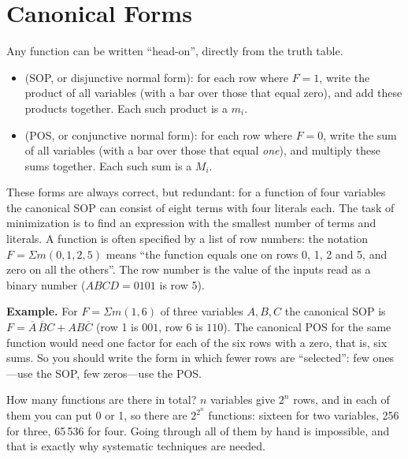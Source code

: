 \section{Canonical Forms}

Any function can be written ``head-on'', directly from the truth table.

\begin{itemize}
  \item {} (SOP, or disjunctive normal form):
        for each row where $F=1$, write the product of all variables (with
        a bar over those that equal zero), and add these products together.
        Each such product is a  $m_i$.
  \item {} (POS, or conjunctive normal form):
        for each row where $F=0$, write the sum of all variables (with a bar
        over those that equal \emph{one}), and multiply these sums together.
        Each such sum is a  $M_i$.
\end{itemize}

These forms are always correct, but redundant: for a function of four
variables the canonical SOP can consist of eight terms with four literals
each. The task of minimization is to find an expression with the smallest
number of terms and literals. A function is often specified by a list of row
numbers: the notation $F=\Sigma m(0,1,2,5)$ means ``the function equals one on
rows 0, 1, 2 and 5, and zero on all the others''. The row number is the value
of the inputs read as a binary number ($ABCD=0101$ is row 5).

\textbf{Example.} For $F=\Sigma m(1,6)$ of three variables $A,B,C$ the
canonical SOP is $F=\overline{A}\,\overline{B}C + AB\overline{C}$ (row 1 is
$001$, row 6 is $110$). The canonical POS for the same function would need
one factor for each of the six rows with a zero, that is, six sums. So you
should write the form in which fewer rows are ``selected'': few ones---use
the SOP, few zeros---use the POS.

How many functions are there in total? $n$ variables give $2^n$ rows, and in
each of them you can put 0 or 1, so there are $2^{2^n}$ functions: sixteen for
two variables, 256 for three, 65\,536 for four. Going through all of them by
hand is impossible, and that is exactly why systematic techniques are needed.

